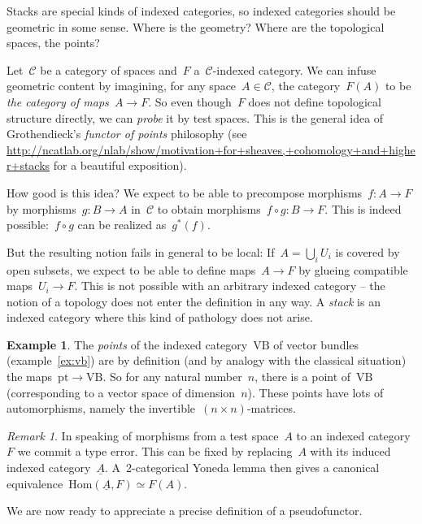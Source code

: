 \documentclass[a4paper,english,12pt]{scrartcl}
\theoremstyle{definition}
\newtheorem{ex}[defn]{Example}
\theoremstyle{plain}
\theoremstyle{remark}
\newtheorem{rem}[defn]{Remark}
\newcommand{\C}{\mathcal{C}}
\newcommand{\VB}{\mathrm{VB}}
\newcommand{\pt}{\mathrm{pt}}
\newcommand{\Hom}{\mathrm{Hom}}
\newcommand{\ul}[1]{\underline{#1}}
\begin{document}
Stacks are special kinds of indexed categories, so indexed categories should
be geometric in some sense. Where is the geometry? Where are the topological spaces, the
points?

Let~$\C$ be a category of spaces and~$F$ a~$\C$-indexed category. We
can infuse geometric content by imagining, for any space~$A \in \C$, the
category~$F(A)$ to be \emph{the category of maps~$A \to F$}. So even though~$F$
does not define topological structure directly, we can \emph{probe} it by test
spaces. This is the general idea of Grothendieck's \emph{functor of points}
philosophy (see
\url{http://ncatlab.org/nlab/show/motivation+for+sheaves,+cohomology+and+higher+stacks}
for a beautiful exposition).

How good is this idea? We expect to be able to precompose morphisms~$f : A \to F$
by morphisms~$g : B \to A$ in~$\C$ to obtain morphisms~$f \circ g : B \to F$.
This is indeed possible:~$f \circ g$ can be realized as~$g^*(f)$.

But the resulting notion fails in general to be local: If~$A = \bigcup_i U_i$
is covered by open subsets, we expect to be able to define maps~$A \to F$ by
glueing compatible maps~$U_i \to F$. This is not possible with an arbitrary
indexed category -- the notion of a topology does not enter the definition in
any way. A \emph{stack} is an indexed category where this kind of pathology does not
arise.

\begin{ex}The \emph{points} of the indexed category~$\VB$ of vector bundles
(example~\ref{ex:vb}) are by definition (and by analogy with the classical
situation) the maps~$\pt \to \VB$. So for any natural number~$n$, there is a point
of~$\VB$ (corresponding to a vector space of dimension~$n$). These points
have lots of automorphisms, namely the invertible~$(n \times n)$-matrices.
\end{ex}

\begin{rem}In speaking of morphisms from a test space~$A$ to an indexed
category~$F$ we commit a type error. This can be fixed by replacing~$A$ with
its induced indexed category~$\ul{A}$. A~2-categorical Yoneda lemma then gives
a canonical equivalence~$\Hom(\ul{A},F) \simeq F(A)$.
\end{rem}

We are now ready to appreciate a precise definition of a pseudofunctor.
\end{document}

